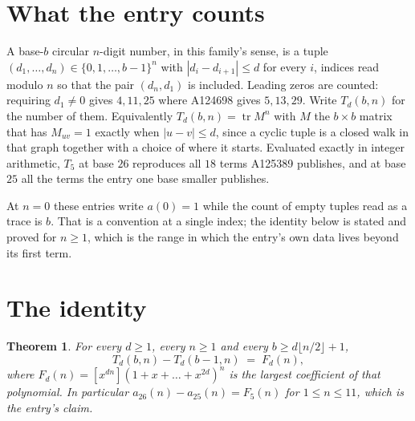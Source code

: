 \documentclass[11pt,a4paper]{article}
\theoremstyle{plain}
\newtheorem{theorem}{Theorem}
\theoremstyle{definition}
\begin{document}
\section{What the entry counts}

A base-$b$ circular $n$-digit number, in this family's sense, is a tuple
$(d_1,\dots,d_n)\in\{0,1,\dots,b-1\}^{n}$ with $|d_i-d_{i+1}|\le d$ for every $i$, indices
read modulo $n$ so that the pair $(d_n,d_1)$ is included. Leading zeros are counted: requiring
$d_1\ne0$ gives $4,11,25$ where A124698 gives $5,13,29$. Write $T_d(b,n)$ for the number of
them. Equivalently $T_d(b,n)=\operatorname{tr}M^{n}$ with $M$ the $b\times b$ matrix that has
$M_{uv}=1$ exactly when $|u-v|\le d$, since a cyclic tuple is a closed walk in that graph
together with a choice of where it starts. Evaluated exactly in integer arithmetic, $T_{5}$
at base $26$ reproduces all $18$ terms A125389 publishes, and at base $25$ all the
terms the entry one base smaller publishes.

At $n=0$ these entries write $a(0)=1$ while the count of empty tuples read as a trace is $b$.
That is a convention at a single index; the identity below is stated and proved for $n\ge1$,
which is the range in which the entry's own data lives beyond its first term.

\section{The identity}

\begin{theorem}
For every $d\ge1$, every $n\ge1$ and every $b\ge d\lfloor n/2\rfloor+1$,
\[
T_d(b,n)-T_d(b-1,n)\;=\;F_d(n),
\]
where $F_d(n)=[x^{dn}](1+x+\dots+x^{2d})^{n}$ is the largest coefficient of that
polynomial. In particular $a_{26}(n)-a_{25}(n)=F_{5}(n)$ for $1\le n\le11$, which
is the entry's claim.
\end{theorem}
\end{document}
